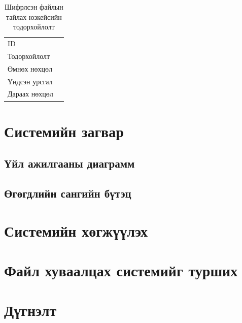 \begin{table}
    \caption{Шифрлсэн файлын тайлах юзкейсийн тодорхойлолт}
    \label{tab:treatments}
    \footnotesize
    \centering
    \begin{tabularx}{\textwidth}{|>{\hsize=0.3\hsize}X|>{\hsize=0.7\hsize}X|}
        \hline
        \multicolumn{2}{|c|}{Шифрлсэн файлын тайлах} \\
        \hline
        ID & 7 \\
        \hline
        Тодорхойлолт & \\
        \hline
        Өмнөх нөхцөл & \\
        \hline
        Үндсэн урсгал & \\
        \hline
        Дараах нөхцөл & \\
        \hline
      \end{tabularx}
\end{table}

\section{Системийн загвар}

\subsection*{Үйл ажилгааны диаграмм}

\subsection*{Өгөгдлийн сангийн бүтэц}

\section{Системийн хөгжүүлэх}

\section{Файл хуваалцах системийг турших}

\section{Дүгнэлт}


